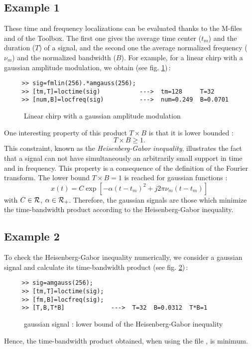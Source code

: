 \subsection{Example 1} 
\label{ex1}
These time and frequency localizations can be evaluated thanks to the
M-files  and  of the Toolbox. The first one gives the
average time center ($t_m$) and the duration ($T$) of a signal, and the
second one the average normalized frequency ($\nu_m$) and the normalized
bandwidth ($B$). For example, for a linear chirp with a gaussian amplitude
modulation, we obtain (see fig. \ref{Ns2fig1})\,:
\begin{verbatim}
     >> sig=fmlin(256).*amgauss(256);
     >> [tm,T]=loctime(sig)           --->  tm=128     T=32
     >> [num,B]=locfreq(sig)          --->  num=0.249  B=0.0701
\end{verbatim}
\begin{figure}[htb]
\epsfxsize=10cm
\epsfysize=8cm
\centerline{}
\caption{\label{Ns2fig1}Linear chirp with a gaussian amplitude modulation}
\end{figure}

  One interesting property of this product $T\times B$ is that it is lower
bounded :
\[T \times B \geq 1.\]
 This constraint, known as the {\it
Heisenberg-Gabor inequality}, illustrates the fact that a signal can not
have simultaneously an arbitrarily small support in time and in
frequency. This property is a consequence of the definition of the Fourier
transform. The lower bound $T\times B = 1$ is reached for gaussian
functions :
\[x(t) = C \exp{[-\alpha(t - t_m)^2 + j2\pi \nu_m(t-t_m)]}\]
with $C \in {\cal R}$, $\alpha \in {\cal R}_{+}$. Therefore, the
gaussian signals are those which minimize the time-bandwidth product
according to the Heisenberg-Gabor inequality.\\

\subsection{Example 2}

 To check the Heisenberg-Gabor inequality numerically, we consider a
gaussian signal and calculate its time-bandwidth product (see
fig. \ref{Ns2fig2})\,: 
\begin{verbatim}
     >> sig=amgauss(256);
     >> [tm,T]=loctime(sig); 
     >> [fm,B]=locfreq(sig);
     >> [T,B,T*B]             --->  T=32  B=0.0312  T*B=1	       
\end{verbatim}
\begin{figure}[htb]
\epsfxsize=10cm
\epsfysize=8cm
\centerline{}
\caption{\label{Ns2fig2}gaussian signal : lower bound of the
Heisenberg-Gabor inequality}
\end{figure}
Hence, the time-bandwidth product obtained, when using the file
, is minimum.

